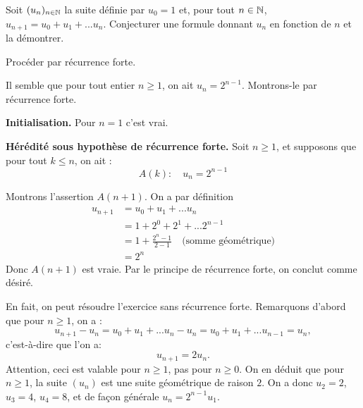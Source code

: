 \begin{exo}
Soit $(u_n)_{n\in \mathbb N}$ la suite définie par $u_0=1$ et, pour tout $n\in \mathbb N$, $u_{n+1}=u_0+u_1+ ... u_n$. Conjecturer une formule donnant $u_n$ en fonction de $n$ et la démontrer.
\begin{hint}
Procéder par récurrence forte.
\end{hint}
\begin{sol}

Il semble que pour tout entier $n\geq 1$, on ait $u_n = 2^{n-1}$. Montrons-le par récurrence forte.

\noindent \textbf{Initialisation.} Pour $n=1$ c'est vrai.

\noindent\textbf{Hérédité sous hypothèse de récurrence forte.} Soit $n\geq 1$, et supposons que pour tout $k\leq n$, on ait :
\[ A(k): \quad u_n = 2^{n-1} \]

Montrons l'assertion $A(n+1)$. On a par définition
\begin{align*}
u_{n+1}
&= u_0+u_1+ ... u_n\\
&= 1 + 2^0 + 2^1+ ...2^{n-1}\\
&= 1+ \frac{2^n-1}{2-1} \quad \text{(somme géométrique)}\\
&= 2^n
\end{align*}
Donc $A(n+1)$ est vraie. Par le principe de récurrence forte, on conclut comme désiré.\\

\begin{remarque}
En fait, on peut résoudre l'exercice sans récurrence forte. Remarquons d'abord que pour $n\geq 1$, on a :
\[u_{n+1}-u_n = u_0+u_1+ ... u_n - u_n = u_0+u_1+ ... u_{n-1} = u_n,\]
c'est-à-dire que l'on a:
\[ u_{n+1} = 2u_n.\]
Attention, ceci est valable pour $n\geq 1$, pas pour $n\geq 0$. On en déduit que pour $n\geq 1$, la suite  $(u_n)$ est une suite géométrique de raison $2$. On a donc $u_2 = 2$, $u_3 = 4$, $u_4=8$, et de façon générale $u_n = 2^{n-1}u_1$.
\end{remarque}
\end{sol}
\end{exo}





